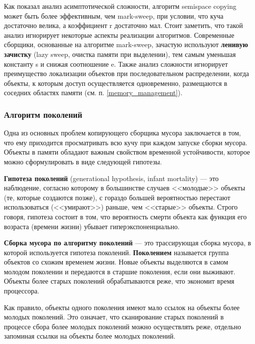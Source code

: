 Как показал анализ асимптотической сложности, алгоритм semispace copying может быть более эффективным, чем mark-sweep, при условии, что куча достаточно велика, а коэффициент r достаточно мал. Стоит заметить, что такой анализ игнорирует некоторые аспекты реализации алгоритмов. Современные сборщики, основанные на алгоритме mark-sweep, зачастую используют \textbf{ленивую зачистку} (lazy sweep, очистка памяти при выделении), тем самым уменьшая константу s и снижая соотношение e. Также анализ сложности игнорирует преимущество локализации объектов при последовательном распределении, когда объекты, к которым доступ осуществляется одновременно, размещаются в соседних областях памяти (см. п. \ref{memory_management}).



\subsubsection{Алгоритм поколений}
\label{generational}

Одна из основных проблем копирующего сборщика мусора заключается в том, что ему приходится просматривать всю кучу при каждом запуске сборки мусора. Объекты в памяти обладают важным свойством временной устойчивости, которое можно сформулировать в виде следующей гипотезы. \cite{cornell3}

\textbf{Гипотеза поколений} (generational hypothesis, infant mortality) \cite{glossary} --- это наблюдение, согласно которому в большинстве случаев <<молодые>> объекты (те, которые создаются позже), с гораздо большей вероятностью перестают использоваться (<<умирают>>) раньше, чем <<старые>> объекты. Строго говоря, гипотеза состоит в том, что вероятность смерти объекта как функция его возраста (времени жизни) убывает гиперэкспоненциально.

\textbf{Сборка мусора по алгоритму поколений} \cite{glossary} --- это трассирующая сборка мусора, в которой используется гипотеза поколений. \textbf{Поколением} называется группа объектов со схожим временем жизни. Новые объекты выделяются в самом молодом поколении и передаются в старшие поколения, если они выживают. Объекты более старых поколений обрабатываются реже, что экономит время процессора.

Как правило, объекты одного поколения имеют мало ссылок на объекты более молодых поколений. Это означает, что сканирование старых поколений в процессе сбора более молодых поколений можно осуществлять реже, отдельно запоминая ссылки на объекты более молодых поколений. \cite{cornell3}

